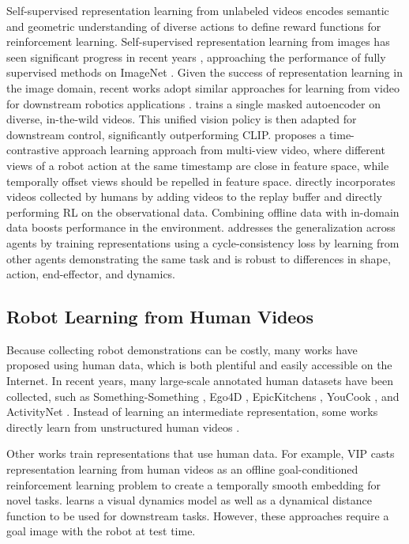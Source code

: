 Self-supervised representation learning from unlabeled videos encodes semantic and geometric understanding of diverse actions to define reward functions for reinforcement learning. Self-supervised representation learning from images has seen significant progress in recent years \cite{pathak2016context, chen2020simclr, caron2021dino, MAE, BYOL}, approaching the performance of fully supervised methods on ImageNet \cite{russakovsky2014imagenet}. Given the success of representation learning in the image domain, recent works adopt similar approaches for learning from video for downstream robotics applications \cite{srinivas2020curl}. \cite{radasavovic22robotmaskedpretraining} trains a single masked autoencoder \cite{MAE} on diverse, in-the-wild videos. This unified vision policy is then adapted for downstream control, significantly outperforming CLIP. \cite{sermanet18timecontrastive} proposes a time-contrastive approach learning approach from multi-view video, where different views of a robot action at the same timestamp are close in feature space, while temporally offset views should be repelled in feature space. \cite{schmeckpeper20rlvideos} directly incorporates videos collected by humans by adding videos to the replay buffer and directly performing RL on the observational data. Combining offline data with in-domain data boosts performance in the environment. \cite{zakka21xirl} addresses the generalization across agents by training representations using a cycle-consistency loss by learning from other agents demonstrating the same task and is robust to differences in shape, action, end-effector, and dynamics. 


\subsection{Robot Learning from Human Videos} 

Because collecting robot demonstrations can be costly, many works have proposed using human data, which is both plentiful and easily accessible on the Internet. In recent years, many large-scale annotated human datasets have been collected, such as Something-Something \cite{SomethingSomething_ICCV}, Ego4D \cite{ego4d}, EpicKitchens \cite{epickitchens}, YouCook \cite{youcook}, and ActivityNet \cite{caba2015activitynet}. Instead of learning an intermediate representation, some works directly learn from unstructured human videos \cite{bahl22whirl, shaw2022video, bahl2023affordances}.

Other works train representations \cite{r3m, radasavovic22robotmaskedpretraining, VIP, radford21clip} that use human data. For example, VIP \cite{VIP} casts representation learning from human videos as an offline goal-conditioned reinforcement learning problem to create a temporally smooth embedding for novel tasks. \cite{tian21functionaldistances} learns a visual dynamics model as well as a dynamical distance function to be used for downstream tasks. However, these approaches require a goal image with the robot at test time.

